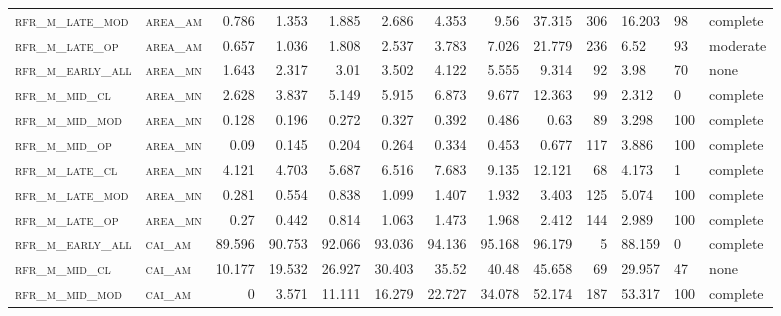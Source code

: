 \begin{landscape}
\begin{center}
\begin{longtable}{llrrrrr|rrr}
\textsc{rfr\_m\_late\_mod } & \textsc{area\_am  }   & 0.786   & 1.353   & 1.885   & 2.686    & 4.353    & 9.56     & 37.315   & 306    & 16.203        & 98            & complete       \\
\textsc{rfr\_m\_late\_op  } & \textsc{area\_am  }   & 0.657   & 1.036   & 1.808   & 2.537    & 3.783    & 7.026    & 21.779   & 236    & 6.52          & 93            & moderate       \\
\textsc{rfr\_m\_early\_all} & \textsc{area\_mn  }   & 1.643   & 2.317   & 3.01    & 3.502    & 4.122    & 5.555    & 9.314    & 92     & 3.98          & 70            & none       \\
\textsc{rfr\_m\_mid\_cl   } & \textsc{area\_mn  }   & 2.628   & 3.837   & 5.149   & 5.915    & 6.873    & 9.677    & 12.363   & 99     & 2.312         & 0             & complete           \\
\textsc{rfr\_m\_mid\_mod  } & \textsc{area\_mn  }   & 0.128   & 0.196   & 0.272   & 0.327    & 0.392    & 0.486    & 0.63     & 89     & 3.298         & 100           & complete       \\
\textsc{rfr\_m\_mid\_op   } & \textsc{area\_mn  }   & 0.09    & 0.145   & 0.204   & 0.264    & 0.334    & 0.453    & 0.677    & 117    & 3.886         & 100           & complete       \\
\textsc{rfr\_m\_late\_cl  } & \textsc{area\_mn  }   & 4.121   & 4.703   & 5.687   & 6.516    & 7.683    & 9.135    & 12.121   & 68     & 4.173         & 1             & complete       \\
\textsc{rfr\_m\_late\_mod } & \textsc{area\_mn  }   & 0.281   & 0.554   & 0.838   & 1.099    & 1.407    & 1.932    & 3.403    & 125    & 5.074         & 100           & complete       \\
\textsc{rfr\_m\_late\_op  } & \textsc{area\_mn  }   & 0.27    & 0.442   & 0.814   & 1.063    & 1.473    & 1.968    & 2.412    & 144    & 2.989         & 100           & complete       \\
\textsc{rfr\_m\_early\_all} & \textsc{cai\_am   }   & 89.596  & 90.753  & 92.066  & 93.036   & 94.136   & 95.168   & 96.179   & 5      & 88.159        & 0             & complete           \\
\textsc{rfr\_m\_mid\_cl   } & \textsc{cai\_am   }   & 10.177  & 19.532  & 26.927  & 30.403   & 35.52    & 40.48    & 45.658   & 69     & 29.957        & 47            & none       \\
\textsc{rfr\_m\_mid\_mod  } & \textsc{cai\_am   }   & 0       & 3.571   & 11.111  & 16.279   & 22.727   & 34.078   & 52.174   & 187    & 53.317        & 100           & complete       \\

\end{longtable}
\end{center}
\end{landscape}
